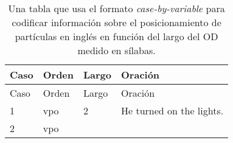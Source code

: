 \documentclass[12pt,spanish,a4paper,]{article}
\begin{document}
\begin{longtable}[]{@{}llll@{}}
\caption{\protect\hypertarget{cbv}{}{Una} tabla que usa el formato
\emph{case-by-variable} para codificar información sobre el
posicionamiento de partículas en inglés en función del largo del OD
medido en sílabas.}\tabularnewline
\toprule
\begin{minipage}[b]{0.08\columnwidth}\raggedright
Caso\strut
\end{minipage} & \begin{minipage}[b]{0.09\columnwidth}\raggedright
Orden\strut
\end{minipage} & \begin{minipage}[b]{0.09\columnwidth}\raggedright
Largo\strut
\end{minipage} & \begin{minipage}[b]{0.63\columnwidth}\raggedright
Oración\strut
\end{minipage}\tabularnewline
\midrule
\endfirsthead
\toprule
\begin{minipage}[b]{0.08\columnwidth}\raggedright
Caso\strut
\end{minipage} & \begin{minipage}[b]{0.09\columnwidth}\raggedright
Orden\strut
\end{minipage} & \begin{minipage}[b]{0.09\columnwidth}\raggedright
Largo\strut
\end{minipage} & \begin{minipage}[b]{0.63\columnwidth}\raggedright
Oración\strut
\end{minipage}\tabularnewline
\midrule
\endhead
\begin{minipage}[t]{0.08\columnwidth}\raggedright
1\strut
\end{minipage} & \begin{minipage}[t]{0.09\columnwidth}\raggedright
vpo\strut
\end{minipage} & \begin{minipage}[t]{0.09\columnwidth}\raggedright
2\strut
\end{minipage} & \begin{minipage}[t]{0.63\columnwidth}\raggedright
He turned on the lights.\strut
\end{minipage}\tabularnewline
\begin{minipage}[t]{0.08\columnwidth}\raggedright
2\strut
\end{minipage} & \begin{minipage}[t]{0.09\columnwidth}\raggedright
vpo\strut
\end{minipage} & \begin{minipage}[t]{0.09\columnwidth}\raggedright

\end{minipage}
\end{longtable}
\end{document}
